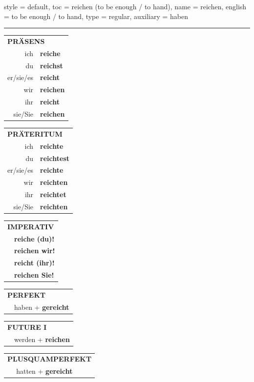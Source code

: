 \begin{verbentry}{
  style = {default},
  toc = {reichen (to be enough / to hand)},
  name = {reichen},
  english = {to be enough / to hand},
  type = {regular},
  auxiliary = {haben}
}
 

\vspace{5pt}
\hrule
\vspace{5pt}

\begin{tabular}{rl}
\multicolumn{2}{l}{\textbf{PRÄSENS}}\\
ich & \textbf{reiche}\\
du & \textbf{reichst}\\
er/sie/es & \textbf{reicht}\\
wir & \textbf{reichen}\\
ihr & \textbf{reicht}\\
sie/Sie & \textbf{reichen}\\
\end{tabular}
\hfill
\begin{tabular}{rl}
\multicolumn{2}{l}{\textbf{PRÄTERITUM}}\\
ich & \textbf{reichte}\\
du & \textbf{reichtest}\\
er/sie/es & \textbf{reichte}\\
wir & \textbf{reichten}\\
ihr & \textbf{reichtet}\\
sie/Sie & \textbf{reichten}\\
\end{tabular}
\hfill
\begin{tabular}{rl}
\multicolumn{2}{l}{\textbf{IMPERATIV}}\\
& \textbf{reiche (du)!}\\
& \textbf{reichen wir!}\\
& \textbf{reicht (ihr)!}\\
& \textbf{reichen Sie!}\\
\end{tabular}

\vspace{10pt}

\begin{tabular}{rl}
\multicolumn{2}{l}{\textbf{PERFEKT}}\\
& haben + \textbf{gereicht}\\
\end{tabular}
\hfill
\begin{tabular}{rl}
\multicolumn{2}{l}{\textbf{FUTURE I}}\\
& werden + \textbf{reichen}\\
\end{tabular}
\hfill
\begin{tabular}{rl}
\multicolumn{2}{l}{\textbf{PLUSQUAMPERFEKT}}\\
& hatten + \textbf{gereicht}\\
\end{tabular}


\end{verbentry}
